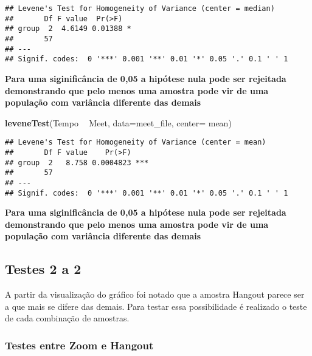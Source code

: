 \documentclass[
]{article}
\newenvironment{Shaded}{\begin{snugshade}}{\end{snugshade}}
\newcommand{\DataTypeTok}[1]{\textcolor[rgb]{0.13,0.29,0.53}{#1}}
\newcommand{\KeywordTok}[1]{\textcolor[rgb]{0.13,0.29,0.53}{\textbf{#1}}}
\newcommand{\NormalTok}[1]{#1}
\newcommand{\OperatorTok}[1]{\textcolor[rgb]{0.81,0.36,0.00}{\textbf{#1}}}
\newcommand{\StringTok}[1]{\textcolor[rgb]{0.31,0.60,0.02}{#1}}
\begin{document}
\begin{verbatim}
## Levene's Test for Homogeneity of Variance (center = median)
##       Df F value  Pr(>F)  
## group  2  4.6149 0.01388 *
##       57                  
## ---
## Signif. codes:  0 '***' 0.001 '**' 0.01 '*' 0.05 '.' 0.1 ' ' 1
\end{verbatim}

\textbf{Para uma siginificância de 0,05 a hipótese nula pode ser
rejeitada demonstrando que pelo menos uma amostra pode vir de uma
população com variância diferente das demais}

\begin{Shaded}
\begin{Highlighting}[]
\KeywordTok{leveneTest}\NormalTok{(Tempo }\OperatorTok{~}\StringTok{ }\NormalTok{Meet, }\DataTypeTok{data=}\NormalTok{meet_file, }\DataTypeTok{center=}\NormalTok{ mean)}
\end{Highlighting}
\end{Shaded}

\begin{verbatim}
## Levene's Test for Homogeneity of Variance (center = mean)
##       Df F value    Pr(>F)    
## group  2   8.758 0.0004823 ***
##       57                      
## ---
## Signif. codes:  0 '***' 0.001 '**' 0.01 '*' 0.05 '.' 0.1 ' ' 1
\end{verbatim}

\textbf{Para uma siginificância de 0,05 a hipótese nula pode ser
rejeitada demonstrando que pelo menos uma amostra pode vir de uma
população com variância diferente das demais}

\hypertarget{testes-2-a-2}{%
\subsection{Testes 2 a 2}\label{testes-2-a-2}}

A partir da visualização do gráfico foi notado que a amostra Hangout
parece ser a que mais se difere das demais. Para testar essa
possibilidade é realizado o teste de cada combinação de amostras.

\hypertarget{testes-entre-zoom-e-hangout}{%
\subsubsection{Testes entre Zoom e
Hangout}\label{testes-entre-zoom-e-hangout}}

\begin{Shaded}
\end{Shaded}
\end{document}
